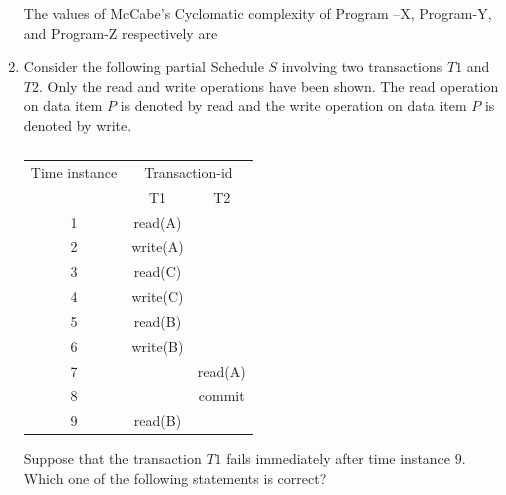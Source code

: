 \documentclass[journal,12pt,onecolumn]{IEEEtran}
\theoremstyle{remark}
\begin{document}
\begin{enumerate}
				
				\hfill{}
				
				The values of McCabe's Cyclomatic complexity of Program –X, Program-Y, and Program-Z respectively are
				
				\begin{enumerate}
				\end{enumerate}
				
				\item Consider the following partial Schedule $S$ involving two transactions $T1$ and $T2$. Only the read and write operations have been shown. The read operation on data item $P$ is denoted by read and the write operation on data item $P$ is denoted by write.
				
				\begin{table}[h]
					\centering
					\caption*{}
					\label{tab:schedule}
					\begin{tabular}{|c|c|c|}
						\hline
						Time instance & \multicolumn{2}{c|}{Transaction-id} \\
						\cline{2-3}
						& T1 & T2 \\
						\hline
						1 & read(A) & \\
												\hline
						2 & write(A) & \\
												\hline
						3 & read(C) & \\
												\hline
												
						4 & write(C) & \\
												\hline
						5 & read(B) & \\
												\hline
						6 & write(B) & \\
												\hline
						7 & & read(A) \\
												\hline
						8 & & commit \\
												\hline
						9 & read(B) & \\
						\hline
					\end{tabular}
				\end{table}
				
				Suppose that the transaction $T1$ fails immediately after time instance $9$. Which one of the following statements is correct?
				

\end{enumerate}
\end{document}
